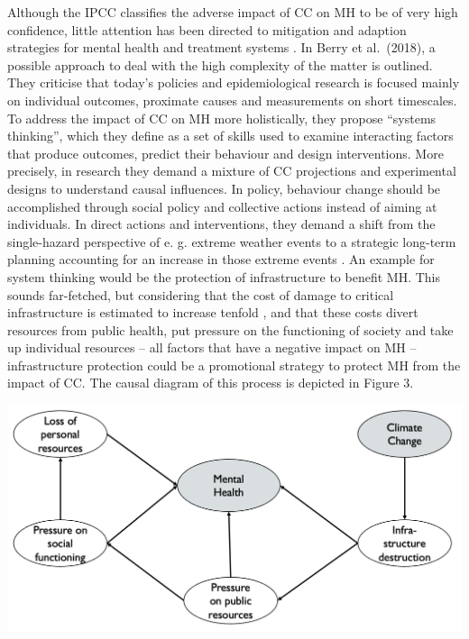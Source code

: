 \documentclass[
]{krantz}
\begin{document}
Although the IPCC classifies the adverse impact of CC on MH to be of very high confidence, little attention has been directed to mitigation and adaption strategies for mental health and treatment systems \citep{charlsonClimateChangeMental2021}. In Berry et al.~(2018), a possible approach to deal with the high complexity of the matter is outlined. They criticise that today's policies and epidemiological research is focused mainly on individual outcomes, proximate causes and measurements on short timescales. To address the impact of CC on MH more holistically, they propose ``systems thinking'', which they define as a set of skills used to examine interacting factors that produce outcomes, predict their behaviour and design interventions. More precisely, in research they demand a mixture of CC projections and experimental designs to understand causal influences. In policy, behaviour change should be accomplished through social policy and collective actions instead of aiming at individuals. In direct actions and interventions, they demand a shift from the single-hazard perspective of e. g. extreme weather events to a strategic long-term planning accounting for an increase in those extreme events \citep{berryCaseSystemsThinking2018}.
An example for system thinking would be the protection of infrastructure to benefit MH. This sounds far-fetched, but considering that the cost of damage to critical infrastructure is estimated to increase tenfold \citep{forzieriEscalatingImpactsClimate2018}, and that these costs divert resources from public health, put pressure on the functioning of society and take up individual resources -- all factors that have a negative impact on MH -- infrastructure protection could be a promotional strategy to protect MH from the impact of CC. The causal diagram of this process is depicted in Figure 3.

\begin{center}\includegraphics[width=0.75\linewidth]{work/12-mentalhealth/figures/DAG_infra_2} \end{center}
\end{document}
